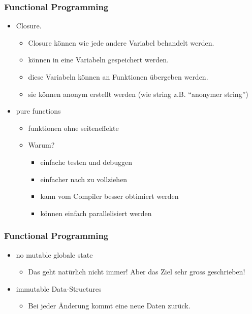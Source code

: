 \documentclass[compress, blue]{beamer}
\begin{document}
\begin{frame}\frametitle{Functional Programming}
  \begin{itemize}
  \item Closure.\pause
    \begin{itemize}
      \item Closure können wie jede andere Variabel behandelt werden.\pause
      \item können in eine Variabeln gespeichert werden.\pause
      \item diese Variabeln können an Funktionen übergeben werden.\pause
      \item sie können anonym erstellt werden (wie string
        z.B. ``anonymer string'') \pause
    \end{itemize}
  \end{itemize}

  \begin{itemize}
  \item pure functions \pause
    \begin{itemize}
       \item funktionen ohne  seiteneffekte \pause
       \item Warum? \pause
         \begin{itemize}
          \item einfache testen und debuggen \pause
          \item einfacher nach zu vollziehen \pause
          \item kann vom Compiler besser obtimiert werden \pause
          \item können einfach parallelisiert werden \pause
         \end{itemize}
    \end{itemize}
  \end{itemize}
\end{frame}


\begin{frame}\frametitle{Functional Programming}
  \begin{itemize}
  \item no mutable globale state \pause
    \begin{itemize}
       \item Das geht natürlich nicht immer! Aber das Ziel sehr gross
         geschrieben! \pause
    \end{itemize}
  \end{itemize}

  \begin{itemize}
  \item immutable Data-Structures \pause
    \begin{itemize}
       \item Bei jeder Änderung kommt eine neue Daten
         zurück.
    \end{itemize}
  \end{itemize}
\end{frame}
\end{document}
